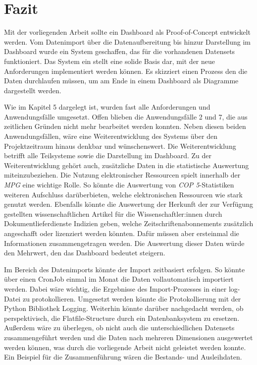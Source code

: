 
\chapter{Fazit}
\label{chap:six}
Mit der vorliegenden Arbeit sollte ein Dashboard als Proof-of-Concept entwickelt werden.
Vom Datenimport über die Datenaufbereitung bis hinzur Darstellung im Dashboard wurde ein System geschaffen,
das für die vorhandenen Datensets funktioniert. 
Das System ein stellt eine solide Basis dar, mit der neue Anforderungen implementiert werden können. Es skizziert
einen Prozess den die Daten durchlaufen müssen, um am Ende in einem Dashboard als Diagramme dargestellt werden.

Wie im Kapitel 5 dargelegt ist, wurden fast alle Anforderungen und Anwendungsfälle umgesetzt.
Offen blieben die Anwendungsfälle 2 und 7, die aus zeitlichen Gründen nicht mehr bearbeitet werden konnten.
Neben diesen beiden Anwendungsfällen, wäre eine Weiterentwicklung des Systems über den Projektzeitraum hinaus denkbar und wünschenswert.
Die Weiterentwicklung betrifft alle Teilsysteme sowie die Darstellung im Dashboard. 
Zu der Weiterentwicklung gehört auch, zusätzliche Daten in die statistische Auswertung miteinzubeziehen. 
Die Nutzung elektronischer Ressourcen spielt innerhalb der \textit{\acrshort{MPG}} eine wichtige Rolle.
So könnte die Auswertung von \textit{\acrshort{COP 5}}-Statistiken weiteren Aufschluss darüberbieten, welche elektronischen Ressourcen wie stark genutzt werden.
Ebenfalls könnte die Auswertung der Herkunft der zur Verfügung gestellten wissenschaftlichen Artikel für die Wissenschaftler:innen durch Dokumentlieferdienste
Indizien geben, welche Zeitschriftenabonnements zusätzlich angeschafft oder lizenziert werden könnten. Dafür müssen aber ersteinmal die Informationen zusammengetragen
werden. Die Auswertung dieser Daten würde den Mehrwert, den das Dashboard bedeutet steigern.


Im Bereich des Datenimports könnte der Import zeitbasiert erfolgen. So könnte über einen CronJob einmal im Monat die
Daten vollautomatisch importiert werden. Dabei wäre wichtig, die Ergebnisse des Import-Prozesses in einer log-Datei zu protokollieren.
Umgesetzt werden könnte die Protokollierung mit der Python Bibliothek Logging. Weiterhin könnte darüber nachgedacht werden, ob perspektivisch,
die Flatfile-Structure durch ein Datenbanksystem zu ersetzen. Außerdem wäre zu überlegen, ob nicht auch die
unterschiedlichen Datensets zusammengeführt werden und die Daten nach mehreren Dimensionen ausgewertet werden können, was durch die vorliegende
Arbeit nicht geleistet werden konnte. Ein Beispiel für die Zusammenführung wären die Bestands- und Ausleihdaten.

